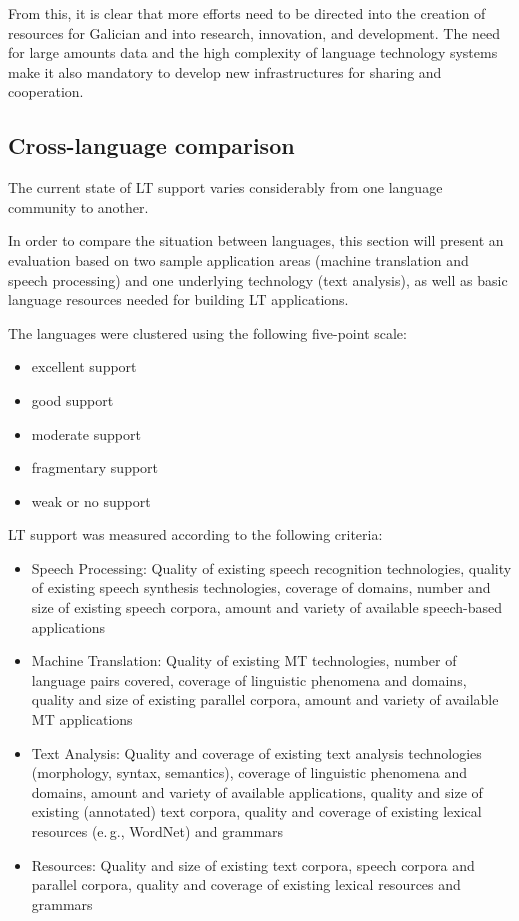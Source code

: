 \begin{multicols}{2}
From this, it is clear that more efforts need to be directed into the creation of resources for Galician and into research, innovation, and development. The need for large amounts data and the high complexity of language technology systems make it also mandatory to develop new infrastructures for sharing and cooperation.


\subsection{Cross-language comparison}

The current state of LT support varies considerably from one language community to another.\vspace*{0.019 cm}

In order to compare the situation between languages, this section will present an evaluation based on two sample application areas (machine translation and speech processing) and one underlying technology (text analysis), as well as basic language resources needed for building LT applications. \vspace*{0.019 cm}

The languages were clustered using the following five-point scale: %

\begin{itemize}
      \item excellent support
      \item good support
      \item moderate support
      \item fragmentary support
      \item weak or no support
\end{itemize}

LT support was measured according to the following criteria:

\begin{itemize}
\item Speech Processing: Quality of existing speech recognition technologies, quality of existing speech synthesis technologies, coverage of domains, number and size of existing speech corpora, amount and variety of available speech-based applications
\item Machine Translation: Quality of existing MT technologies, number of language pairs covered, coverage of linguistic phenomena and domains, quality and size of existing parallel corpora, amount and variety of available MT applications
\item Text Analysis: Quality and coverage of existing text analysis technologies (morphology, syntax, semantics), coverage of linguistic phenomena and domains, amount and variety of available applications, quality and size of existing (annotated) text corpora, quality and coverage of existing lexical resources (e.\,g., WordNet) and grammars
\item Resources: Quality and size of existing text corpora, speech corpora and parallel corpora, quality and coverage of existing lexical resources and grammars
\end{itemize} 


\end{multicols}
